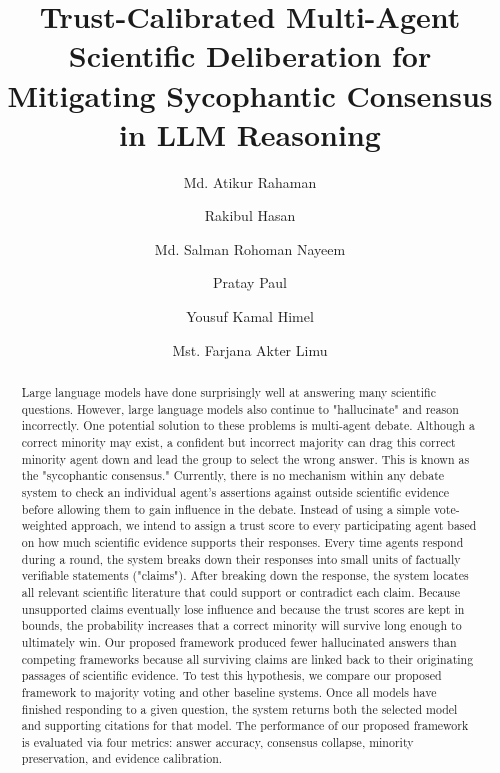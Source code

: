 \documentclass[preprint,11pt,a4paper]{elsarticle}
\begin{document}
\begin{frontmatter}

    \title{Trust-Calibrated Multi-Agent Scientific Deliberation for Mitigating Sycophantic Consensus in LLM Reasoning}

\author{Md. Atikur Rahaman}%
\author{Rakibul Hasan}
\author{Md. Salman Rohoman Nayeem}
\author{Pratay Paul}
\author{Yousuf Kamal Himel}
\author{Mst. Farjana Akter Limu}



    \begin{abstract}
        Large language models have done surprisingly well at answering many scientific questions. However, large language models also continue to "hallucinate" and reason incorrectly. One potential solution to these problems is multi-agent debate. Although a correct minority may exist, a confident but incorrect majority can drag this correct minority agent down and lead the group to select the wrong answer. This is known as the "sycophantic consensus." Currently, there is no mechanism within any debate system to check an individual agent's assertions against outside scientific evidence before allowing them to gain influence in the debate. Instead of using a simple vote-weighted approach, we intend to assign a trust score to every participating agent based on how much scientific evidence supports their responses. Every time agents respond during a round, the system breaks down their responses into small units of factually verifiable statements ("claims"). After breaking down the response, the system locates all relevant scientific literature that could support or contradict each claim. Because unsupported claims eventually lose influence and because the trust scores are kept in bounds, the probability increases that a correct minority will survive long enough to ultimately win. Our proposed framework produced fewer hallucinated answers than competing frameworks because all surviving claims are linked back to their originating passages of scientific evidence. To test this hypothesis, we compare our proposed framework to majority voting and other baseline systems. Once all models have finished responding to a given question, the system returns both the selected model and supporting citations for that model. The performance of our proposed framework is evaluated via four metrics: answer accuracy, consensus collapse, minority preservation, and evidence calibration.
    \end{abstract}


\end{frontmatter}
\end{document}
